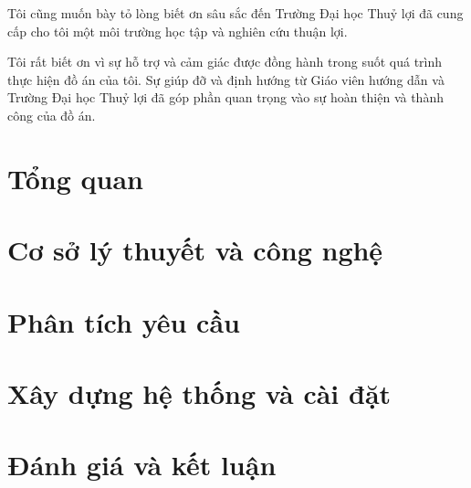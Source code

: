 \documentclass[a4paper,12pt,oneside]{report}
\theoremstyle{definition}
\begin{document}
Tôi cũng muốn bày tỏ lòng biết ơn sâu sắc đến Trường Đại học Thuỷ lợi đã cung cấp cho tôi một môi trường học tập và nghiên cứu thuận lợi.

Tôi rất biết ơn vì sự hỗ trợ và cảm giác được đồng hành trong suốt quá trình thực hiện đồ án của tôi. Sự giúp đỡ và định hướng từ Giáo viên hướng dẫn và Trường Đại học Thuỷ lợi đã góp phần quan trọng vào sự hoàn thiện và thành công của đồ án.

\newpage
\tableofcontents %

\listoffigures %

\glsaddall
\newpage
{}

\newpage
\pagestyle{fancy} %
\chapter{Tổng quan}


\newpage
\pagestyle{fancy} %
\chapter{Cơ sở lý thuyết và công nghệ}


\newpage
\pagestyle{fancy} %
\chapter{Phân tích yêu cầu}


\newpage
\pagestyle{fancy} %
\chapter{Xây dựng hệ thống và cài đặt}


\newpage
\pagestyle{fancy} %
\chapter{Đánh giá và kết luận}


\newpage
\printbibliography %
\end{document}
